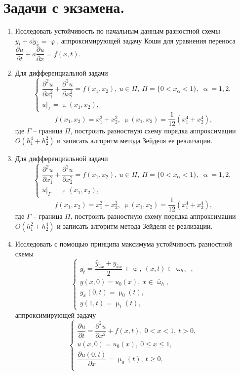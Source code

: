 \documentclass[a4paper, 12pt]{report}
\date{}
\numberwithin{equation}{section}
\newcommand{\ol}{\overline}
\renewcommand{\leq}{\leqslant}
\renewcommand{\geq}{\geqslant}
\renewcommand{\alpha}{\upalpha}
\renewcommand{\varphi}{\upvarphi}
\renewcommand{\tau}{\uptau}
\renewcommand{\mu}{\upmu}
\renewcommand{\omega}{\upomega}
\renewcommand{\d}{\partial}
\begin{document}
	\newpage
	\section*{Задачи с экзамена.}
	\begin{enumerate}
		\item Исследовать устойчивость по начальным данным разностной схемы $y_{\ol t} + a\check y _{\overset{\circ}x}=\varphi$, аппроксимирующей задачу Коши для уравнения переноса $\dfrac{\d u}{\d t} + a \dfrac{\d u}{\d x} = f(x,t).$
		\item Для дифференциальной задачи
		$$\begin{cases}
			\dfrac{\d ^2 u}{\d x_1^2} + \dfrac{\d ^2 u}{\d x_2^2} = f(x_1, x_2),\ u\in \Pi,\ \Pi = \{0< x_\alpha<1\},\ \alpha = 1,2,\\
			u|_{\Gamma} = \mu(x_1,x_2),
		\end{cases}$$
		$$f(x_1,x_2) = x_1^2 + x_2^2,\ \mu(x_1,x_2) = \dfrac{1}{12}(x_1^4 + x_2^4),$$
		где $\Gamma$ -- граница $\Pi$, построить разностную схему порядка аппроксимации $O(h_1^4 + h_2^2)$ и записать алгоритм метода Зейделя ее реализации.
		\item Для дифференциальной задачи
		$$\begin{cases}
			\dfrac{\d ^2 u}{\d x_1^2} + \dfrac{\d ^2 u}{\d x_2^2} = f(x_1, x_2),\ u\in \Pi,\ \Pi = \{0< x_\alpha<1\},\ \alpha = 1,2,\\
			u|_{\Gamma} = \mu(x_1,x_2),
		\end{cases}$$
		$$f(x_1,x_2) = x_1^2 + x_2^2,\ \mu(x_1,x_2) = \dfrac{1}{12}(x_1^4 + x_2^4),$$
		где $\Gamma$ -- граница $\Pi$, построить разностную схему порядка аппроксимации $O(h_1^2 + h_2^4)$ и записать алгоритм метода Зейделя ее реализации.
		\item Исследовать с помощью принципа максимума устойчивость разностной схемы
		$$\begin{cases} 
			y_t = \dfrac{\hat y_{\ol x x} + y_{\ol x x}}{2} + \varphi,\ (x,t) \in \omega_{h \tau},\\
			y(x,0) = u_0(x),\ x \in \ol \omega_h,\\
			y_x(0,t) = \mu_0(t),\\
			y(1,t) = \mu_1(t),
		\end{cases}$$
		аппроксимирующей задачу
		$$\begin{cases}
			\dfrac{\d u}{\d t} = \dfrac{\d ^ 2 u}{\d x ^2} + f(x,t),\ 0<x<1,\ t>0,\\
			u(x,0) = u_0(x),\ 0 \leq x \leq 1,\\
			\dfrac{\d u (0,t)}{\d x} = \mu_0(t),\ t \geq 0,\\

\end{cases}$$
\end{enumerate}
\end{document}
